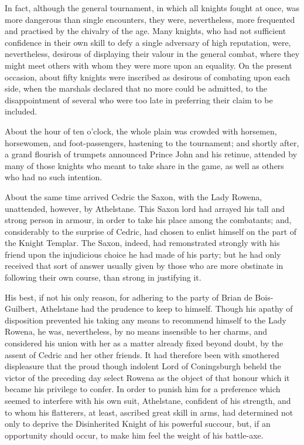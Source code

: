 In fact, although the general tournament, in which all knights fought at
once, was more dangerous than single encounters, they were,
nevertheless, more frequented and practised by the chivalry of the age.
Many knights, who had not sufficient confidence in their own skill to
defy a single adversary of high reputation, were, nevertheless, desirous
of displaying their valour in the general combat, where they might meet
others with whom they were more upon an equality. On the present
occasion, about fifty knights were inscribed as desirous of combating
upon each side, when the marshals declared that no more could be
admitted, to the disappointment of several who were too late in
preferring their claim to be included.

About the hour of ten o'clock, the whole plain was crowded with
horsemen, horsewomen, and foot-passengers, hastening to the tournament;
and shortly after, a grand flourish of trumpets announced Prince John
and his retinue, attended by many of those knights who meant to take
share in the game, as well as others who had no such intention.

About the same time arrived Cedric the Saxon, with the Lady Rowena,
unattended, however, by Athelstane. This Saxon lord had arrayed his tall
and strong person in armour, in order to take his place among the
combatants; and, considerably to the surprise of Cedric, had chosen to
enlist himself on the part of the Knight Templar. The Saxon, indeed, had
remonstrated strongly with his friend upon the injudicious choice he had
made of his party; but he had only received that sort of answer usually
given by those who are more obstinate in following their own course,
than strong in justifying it.

His best, if not his only reason, for adhering to the party of Brian de
Bois-Guilbert, Athelstane had the prudence to keep to himself. Though
his apathy of disposition prevented his taking any means to recommend
himself to the Lady Rowena, he was, nevertheless, by no means insensible
to her charms, and considered his union with her as a matter already
fixed beyond doubt, by the assent of Cedric and her other friends. It
had therefore been with smothered displeasure that the proud though
indolent Lord of Coningsburgh beheld the victor of the preceding day
select Rowena as the object of that honour which it became his privilege
to confer. In order to punish him for a preference which seemed to
interfere with his own suit, Athelstane, confident of his strength, and
to whom his flatterers, at least, ascribed great skill in arms, had
determined not only to deprive the Disinherited Knight of his powerful
succour, but, if an opportunity should occur, to make him feel the
weight of his battle-axe.

